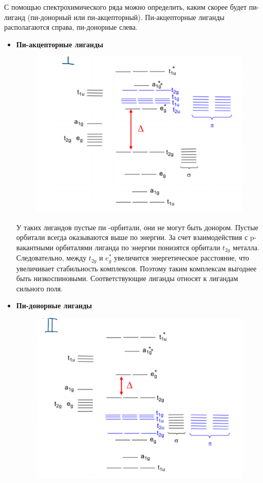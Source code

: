 С помощью спектрохимического ряда можно определить, каким скорее будет пи-лиганд (пи-донорный или пи-акцепторный). Пи-акцепторные лиганды располагаются справа, пи-донорные слева.
\begin{itemize}
\item \textbf{Пи-акцепторные лиганды}
\begin{figure}[H]
\centering
\includegraphics[scale=.750]{images/pi_accept.png}
\end{figure}
У таких лигандов пустые пи
-орбитали, они не могут
быть донором. Пустые орбитали всегда оказываются
выше по энергии. За счет взаимодействия с
p-вакантными орбиталями лиганда по энергии
понизятся орбитали $t_{2g}$ металла. Следовательно,
между $t_{2g}$ и $e_g^*$ увеличится энергетическое
расстояние, что увеличивает стабильность
комплексов. Поэтому таким комплексам выгоднее
быть низкоспиновыми. Соответствующие лиганды
относят к лигандам сильного поля.
\item \textbf{Пи-донорные лиганды}
\begin{figure}[H]
\centering
\includegraphics[scale=.750]{images/pi_don.png}

\end{figure}
\end{itemize}
